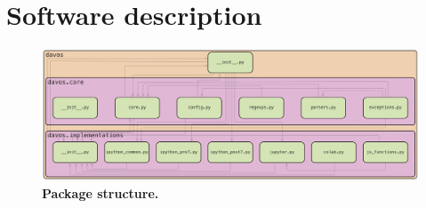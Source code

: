 \documentclass[preprint,12pt,a4paper]{elsarticle}
\begin{document}
\section{Software description}

\begin{figure}[tp]
\centering
\includegraphics[width=\textwidth]{figs/package_structure}
\caption{\small \textbf{Package structure.}}
\label{fig:package-structure}
\end{figure}
\end{document}
